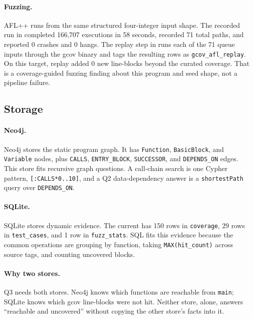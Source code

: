 \documentclass[11pt,twocolumn]{article}
\begin{document}
\paragraph{Fuzzing.}
AFL++ \cite{afl,aflpp} runs from the same structured four-integer input shape. The recorded run
in  completed 166,707 executions in 58 seconds,
recorded 71 total paths, and reported 0 crashes and 0 hangs. The replay step in
 runs each of the 71 queue inputs through the
gcov binary and tags the resulting rows as \texttt{gcov\_afl\_replay}. On this
target, replay added 0 new line-blocks beyond the curated coverage. That is a
coverage-guided fuzzing finding \cite{aflfast} about this program and seed
shape, not a pipeline failure.

\subsection{Storage}

\paragraph{Neo4j.}
Neo4j \cite{neo4j} stores the static program graph. It has \texttt{Function},
\texttt{BasicBlock}, and \texttt{Variable} nodes, plus \texttt{CALLS},
\texttt{ENTRY\_BLOCK}, \texttt{SUCCESSOR}, and \texttt{DEPENDS\_ON} edges.
This store fits recursive graph questions. A call-chain search is one Cypher
pattern, \texttt{[:CALLS*0..10]}, and a Q2 data-dependency answer is a
\texttt{shortestPath} query over \texttt{DEPENDS\_ON}.

\paragraph{SQLite.}
SQLite stores dynamic evidence. The current  has
150 rows in \texttt{coverage}, 29 rows in \texttt{test\_cases}, and 1 row in
\texttt{fuzz\_stats}. SQL fits this evidence because the common operations are
grouping by function, taking \texttt{MAX(hit\_count)} across source tags, and
counting uncovered blocks.

\paragraph{Why two stores.}
Q3 needs both stores. Neo4j knows which functions are reachable from
\texttt{main}; SQLite knows which gcov line-blocks were not hit. Neither store,
alone, answers ``reachable and uncovered'' without copying the other store's
facts into it.
\end{document}
